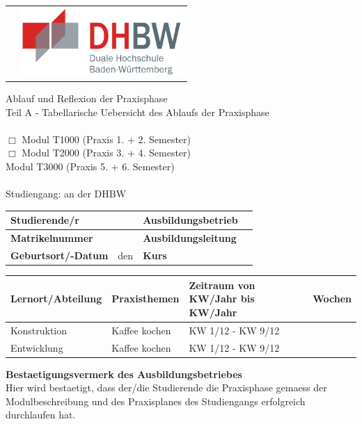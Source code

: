 	\begin{longtable}{p{} p{}}
	 & {\includegraphics[height=2.6cm]{images/dhbw.png}}
	\end{longtable}
	\enlargethispage{20mm}
	Ablauf und Reflexion der Praxisphase\\
	Teil A - Tabellarische Uebersicht des Ablaufs der Praxisphase\\
	\vspace*{2mm}\\
	$\Box$ Modul T1000 (Praxis 1. + 2. Semester)\\
	$\Box$ Modul T2000 (Praxis 3. + 4. Semester)\\
	\checkmark Modul T3000 (Praxis 5. + 6. Semester)\\
	\vspace*{2mm}\\
	Studiengang: \studiengang{} an der DHBW \dhbw\\

	\begin{tabular}{|p{3.5cm}|p{4cm}|p{4cm}|p{4cm}|}
	\hline
	\textbf{Studierende/r} & \autor & \textbf{Ausbildungsbetrieb} & \ausbildungsbetrieb \\
	\hline
	\textbf{Matrikelnummer} & \matrikelnr & \textbf{Ausbildungsleitung} & \ausbildungsleitung \\
	\hline
	\textbf{Geburtsort/-Datum} & \gebort{} den \gebdatum & \textbf{Kurs} & \kurs \\
	\hline
	\end{tabular}

	\begin{tabular}{|p{4cm}|p{7.9cm}|p{1.9cm}|p{1.7cm}|}
		\hline
		\textbf{Lernort/Abteilung} & \textbf{Praxisthemen} & \textbf{Zeitraum} \tiny{von KW/Jahr bis KW/Jahr} & \textbf{Wochen} \\
		\hline
		Konstruktion & Kaffee kochen & KW 1/12 - KW 9/12 & \zeitraumA \\
		\hline
		Entwicklung & Kaffee kochen & KW 1/12 - KW 9/12 & \zeitraumB \\
		\hline
	\end{tabular}

\textbf{Bestaetigungsvermerk des Ausbildungsbetriebes}\\
Hier wird bestaetigt, dass der/die Studierende die Praxisphase gemaess der Modulbeschreibung und des Praxisplanes des Studiengangs erfolgreich durchlaufen hat.\\

